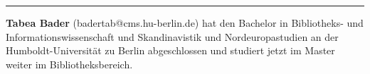 \begin{center}\rule{0.5\linewidth}{\linethickness}\end{center}

\textbf{Tabea Bader} (badertab@cms.hu-berlin.de) hat den Bachelor in
Bibliotheks- und Informationswissenschaft und Skandinavistik und
Nordeuropastudien an der Humboldt-Universität zu Berlin abgeschlossen
und studiert jetzt im Master weiter im Bibliotheksbereich.
